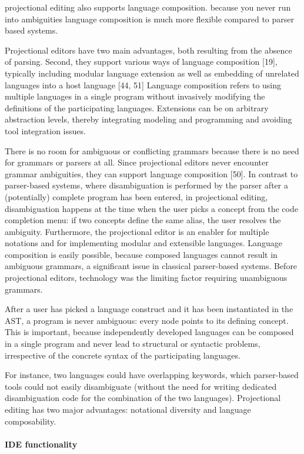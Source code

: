 projectional editing also supports language composition.  because you never run into ambiguities language composition is much more flexible compared to parser based systems.

Projectional editors have two main advantages, both resulting from the absence of parsing.
Second, they support various ways of language composition [19], typically including modular language extension as well as embedding of unrelated languages into a host language [44, 51]
Language composition refers to using multiple languages in a single program without invasively modifying the definitions of the participating languages.
Extensions can be on arbitrary abstraction levels, thereby integrating modeling and programming and avoiding tool integration issues. 


There is no room for ambiguous or conflicting grammars because there is no need for grammars or parsers at all.
Since projectional editors never encounter grammar ambiguities, they can support language composition [50].
In contrast to parser-based systems, where disambiguation is performed by the parser after a (potentially) complete program has been entered, in projectional editing, disambiguation happens at the time when the user picks a concept from the code completion menu: if two concepts define the same alias, the user resolves the ambiguity.
Furthermore, the projectional editor is an enabler for multiple notations and for implementing modular and extensible languages.
Language composition is easily possible, because composed languages cannot result in ambiguous grammars, a significant issue in classical parser-based systems.
Before projectional editors, technology was the limiting factor requiring unambiguous grammars.

After a user has picked a language construct and it has been instantiated in the AST, a program is never ambiguous: every node points to its defining concept.
This is important, because independently developed languages can be composed in a single program and never lead to structural or syntactic problems, irrespective of the concrete syntax of the participating languages.

For instance, two languages could have overlapping keywords, which parser-based tools could not easily disambiguate (without the need for writing dedicated disambiguation code for the combination of the two languages).
Projectional editing has two major advantages: notational diversity and language composability.


\paragraph{IDE functionality}

